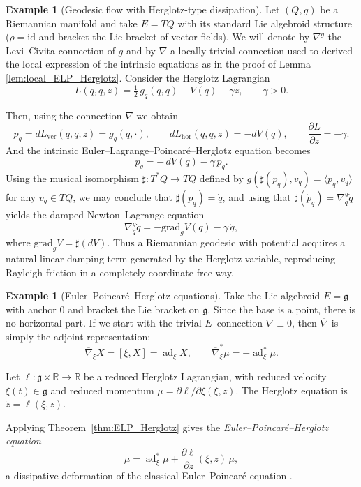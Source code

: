 \documentclass[11pt,a4paper]{article}
\theoremstyle{definition}
\newtheorem{example}[theorem]{Example}
\begin{document}
\begin{example}[Geodesic flow with Herglotz-type dissipation]
\label{ex:geodesic_Herglotz}
Let $(Q,g)$ be a Riemannian manifold and take $E=TQ$ with its standard Lie
algebroid structure ($\rho=\mathrm{id}$ and bracket the Lie bracket of
vector fields).  
We will denote by $\nabla^{g}$ the Levi--Civita connection of $g$ and by $\nabla$ a locally trivial connection used to derived the local expression of the intrinsic equations as in the proof of Lemma \ref{lem:local_ELP_Herglotz}. Consider the Herglotz Lagrangian
\[
L(q,\dot q,z)=\tfrac12\,g_q(\dot q,\dot q)-V(q)-\gamma z,
\qquad \gamma>0.
\]

Then, using the connection $\nabla$ we obtain
\[
p_q=dL_{\mathrm{ver}}(q,\dot q,z)=g_q(\dot q,\cdot),
\qquad
dL_{\mathrm{hor}}(q,\dot q,z)=-dV(q),
\qquad
\frac{\partial L}{\partial z}=-\gamma.
\]
And the intrinsic Euler--Lagrange--Poincar\'e--Herglotz equation becomes
\[
\dot{p}_q
= -\,dV(q) - \gamma\,p_q.
\]
Using the musical isomorphism $\sharp:T^{*}Q \to TQ$ defined by $g(\sharp(p_{q}), v_{q})=\langle p_{q}, v_{q} \rangle$ for any $v_{q}\in TQ$, we may conclude that  $\sharp(p_q)=\dot q$, and using that $\sharp(\dot{p}_{q})=\nabla^{g}_{\dot{q}}\dot{q}$ yields the
damped Newton--Lagrange equation
\[
\nabla^{g}_{\dot q}\dot q
= -\mathrm{grad}_g V(q)-\gamma\,\dot q,
\]
where $\mathrm{grad}_g V=\sharp(dV)$. Thus a Riemannian geodesic with potential acquires a natural linear damping term generated by the Herglotz variable, reproducing Rayleigh friction in a completely coordinate-free way.
\end{example}

\begin{example}[Euler--Poincaré--Herglotz equations]
Take the Lie algebroid $E=\mathfrak{g}$ with anchor $0$ and
bracket the Lie bracket on $\mathfrak g$.  
Since the base is a point, there is no horizontal part.  
If we start with the trivial $E$--connection $\nabla\equiv 0$, then $\overline{\nabla}$ is simply the adjoint representation:
\[
\overline{\nabla}_\xi X=[\xi,X]=\operatorname{ad}_\xi X,\qquad
\overline{\nabla}^{*}_\xi\mu=-\operatorname{ad}^*_\xi\mu.
\]

Let $\ell:\mathfrak g\times\mathbb R\to\mathbb R$ be a reduced Herglotz
Lagrangian, with reduced velocity $\xi(t)\in\mathfrak g$ and reduced
momentum $\mu=\partial\ell/\partial\xi(\xi,z)$.  
The Herglotz equation is $\dot z=\ell(\xi,z)$.

Applying Theorem~\ref{thm:ELP_Herglotz} gives the
\emph{Euler--Poincaré--Herglotz equation}
\[
\dot\mu
=
\operatorname{ad}^*_\xi\mu
+
\frac{\partial\ell}{\partial z}(\xi,z)\,\mu,
\]
a dissipative deformation of the classical Euler--Poincaré equation \cite{anahory2024reduction}.
\end{example}
\end{document}
